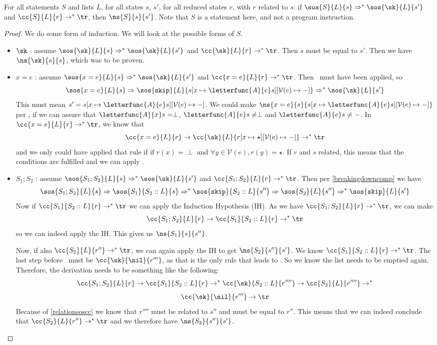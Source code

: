 \begin{lemma}
\label{sosimpns}
For all statements $S$ and lists $L$, for all states $s$, $s'$, for all reduced states $r$, with $r$ related to $s$: if $\sos{S}{L}{s} \Rightarrow ^{*} \sos{\sk}{L}{s'}$ and $\cc{S}{L}{r} \to^{*} \tr$, then $\ns{S}{s}{s'}$. Note that $S$ is a statement here, and not a program instruction. 
\end{lemma}
\begin{proof}
We do some form of induction. We will look at the possible forms of $S$.
\begin{itemize}[noitemsep]
\item $\sk$ : assume $\sos{\sk}{L}{s} \Rightarrow ^{*} \sos{\sk}{L}{s'}$ and $\cc{\sk}{L}{r} \to^{*} \tr$. Then $s$ must be equal to $s'$. Then we have $\ns{\sk}{s}{s}$, which was to be proven. 
\item $x = e$ : assume $\sos{x=e}{L}{s} \Rightarrow^{*} \sos{\sk}{L}{s'}$ and $\cc{x=e}{L}{r} \to^{*} \tr$. Then \asssos ~must have been applied, so 
$$\sos{x=e}{L}{s} \Rightarrow \sos{\texttt{skip}}{L}{s[x \mapsto \letterfunc{A}{e}s][\mathcal{V}(e)\mapsto-]} \Rightarrow^{*} \sos{\sk}{L}{s'}$$
This must mean $s' = s[x \mapsto \letterfunc{A}{e}s][\mathcal{V}(e)\mapsto-]$. We could make $\ns{x=e}{s}{s[x \mapsto \letterfunc{A}{e}s][\mathcal{V}(e)\mapsto-]}$ per \assns, if we can assure that $\letterfunc{A}{x}s = \perp$, $\letterfunc{A}{e}s \neq \perp$ and $\letterfunc{A}{e}s \neq -$. In $\cc{x=e}{L}{r} \to^{*} \tr$, we know that 
$$\cc{x=e}{L}{r} \to \cc{\sk}{L}{r[x \mapsto \star][\mathcal{V}(e)\mapsto-]} \to^{*} \tr$$ 
and we only could have applied that rule if $\textrm{if }r(x) = \perp \textrm{ and } \forall y \in \mathcal{V}(e), r(y) = \star$. If $r$ and $s$ related, this means that the conditions are fulfilled and we can apply \assns. 
\item $S_1; S_2$ : assume $\sos{S_1; S_2}{L}{s} \Rightarrow^{*} \sos{\sk}{L}{s'}$ and $\cc{S_1; S_2}{L}{r} \to^{*} \tr$. Then per \ref{breakingdowncomp} we have 
$$\sos{S_1; S_2}{L}{s} \Rightarrow \sos{S_1}{S_2::L}{s} \Rightarrow ^{*} \sos{\texttt{skip}}{S_2::L}{s''} \Rightarrow \sos{S_2}{L}{s''} \Rightarrow ^{*} \sos{\texttt{skip}}{L}{s'}$$
Now if $\cc{S_1}{S_2::L}{r} \to ^{*} \tr$ we can apply the Induction Hypothesis (IH). 
As we have $\cc{S_1; S_2}{L}{r} \to^{*} \tr$, we can make
$$\cc{S_1; S_2}{L}{r} \to \cc{S_1}{S_2::L}{r} \to ^{*} \tr$$
so we can indeed apply the IH. 
This gives us $\ns{S_1}{s}{s''}$. 

Now, if also $\cc{S_2}{L}{r''} \to ^{*} \tr$, we can again apply the IH to get $\ns{S_2}{s''}{s'}$. We know $\cc{S_1}{S_2::L}{r} \to ^{*} \tr$. The last step before \tr ~must be $\cc{\sk}{\nil}{r'''}$, as that is the only rule that leads to \tr. So we know the list needs to be emptied again. Therefore, the derivation needs to be something like the following: 
$$\cc{S_1; S_2}{L}{r} \to \cc{S_1}{S_2::L}{r} \to^{*} \cc{\sk}{S_2::L}{r''''} \to \cc{S_2}{L}{r''''} \to^{*}$$ 
$$\cc{\sk}{\nil}{r'''} \to  \tr$$
Because of \ref{relationsoscc} we know that $r''''$ must be related to $s''$ and must be equal to $r''$. This means that we can indeed conclude that $\cc{S_2}{L}{r''} \to ^{*} \tr$ and we therefore have $\ns{S_2}{s''}{s'}$. 


\end{itemize}
\end{proof}
